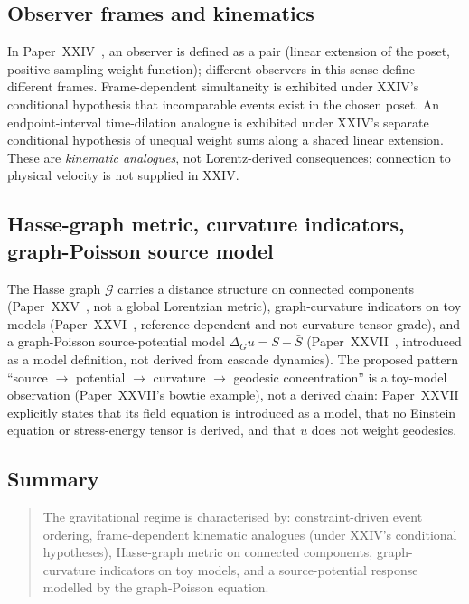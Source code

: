 \documentclass[12pt]{article}
\newcommand{\Gcal}{\mathcal{G}}
\begin{document}
\subsection{Observer frames and kinematics}

In Paper~XXIV~\citep{SmartXXIV}, an observer is defined as a pair (linear extension of the poset, positive sampling weight function); different observers in this sense define different frames. Frame-dependent simultaneity is exhibited under XXIV's conditional hypothesis that incomparable events exist in the chosen poset. An endpoint-interval time-dilation analogue is exhibited under XXIV's separate conditional hypothesis of unequal weight sums along a shared linear extension. These are \emph{kinematic analogues}, not Lorentz-derived consequences; connection to physical velocity is not supplied in XXIV.

\subsection{Hasse-graph metric, curvature indicators, graph-Poisson source model}

The Hasse graph $\Gcal$ carries a distance structure on connected components (Paper~XXV~\citep{SmartXXV}, not a global Lorentzian metric), graph-curvature indicators on toy models (Paper~XXVI~\citep{SmartXXVI}, reference-dependent and not curvature-tensor-grade), and a graph-Poisson source-potential model $\Delta_G u = S - \bar{S}$ (Paper~XXVII~\citep{SmartXXVII}, introduced as a model definition, not derived from cascade dynamics). The proposed pattern ``source $\to$ potential $\to$ curvature $\to$ geodesic concentration'' is a toy-model observation (Paper~XXVII's bowtie example), not a derived chain: Paper~XXVII explicitly states that its field equation is introduced as a model, that no Einstein equation or stress-energy tensor is derived, and that $u$ does not weight geodesics.

\subsection{Summary}

\begin{quote}
The gravitational regime is characterised by: constraint-driven event ordering, frame-dependent kinematic analogues (under XXIV's conditional hypotheses), Hasse-graph metric on connected components, graph-curvature indicators on toy models, and a source-potential response modelled by the graph-Poisson equation.
\end{quote}
\end{document}

